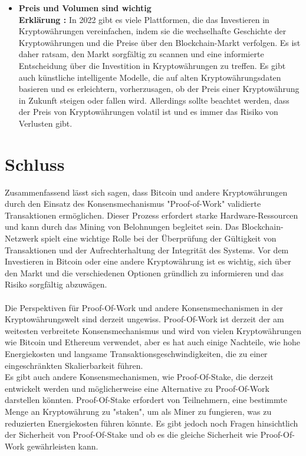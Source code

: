 \documentclass[ngerman]{scrreprt}
\begin{document}
\begin{itemize}
	
	
	\item \textbf{Preis und Volumen sind wichtig} \\
	\textbf{Erklärung :} In 2022 gibt es viele Plattformen, die das Investieren in Kryptowährungen vereinfachen, indem sie die wechselhafte Geschichte der Kryptowährungen und die Preise über den Blockchain-Markt verfolgen. Es ist daher ratsam, den Markt sorgfältig zu scannen und eine informierte Entscheidung über die Investition in Kryptowährungen zu treffen. Es gibt auch künstliche intelligente Modelle, die auf alten Kryptowährungsdaten basieren und es erleichtern, vorherzusagen, ob der Preis einer Kryptowährung in Zukunft steigen oder fallen wird. Allerdings sollte beachtet werden, dass der Preis von Kryptowährungen volatil ist und es immer das Risiko von Verlusten gibt. 
\end{itemize}


\chapter{Schluss}
Zusammenfassend lässt sich sagen, dass Bitcoin und andere Kryptowährungen durch den Einsatz des Konsensmechanismus "Proof-of-Work" validierte Transaktionen ermöglichen. Dieser Prozess erfordert starke Hardware-Ressourcen und kann durch das Mining von Belohnungen begleitet sein. Das Blockchain-Netzwerk spielt eine wichtige Rolle bei der Überprüfung der Gültigkeit von Transaktionen und der Aufrechterhaltung der Integrität des Systems. Vor dem Investieren in Bitcoin oder eine andere Kryptowährung ist es wichtig, sich über den Markt und die verschiedenen Optionen gründlich zu informieren und das Risiko sorgfältig abzuwägen.\\ \\

Die Perspektiven für Proof-Of-Work und andere Konsensmechanismen in der Kryptowährungswelt sind derzeit ungewiss. Proof-Of-Work ist derzeit der am weitesten verbreitete Konsensmechanismus und wird von vielen Kryptowährungen wie Bitcoin und Ethereum verwendet, aber es hat auch einige Nachteile, wie hohe Energiekosten und langsame Transaktionsgeschwindigkeiten, die zu einer eingeschränkten Skalierbarkeit führen. \\

Es gibt auch andere Konsensmechanismen, wie Proof-Of-Stake, die derzeit entwickelt werden und möglicherweise eine Alternative zu Proof-Of-Work darstellen könnten. Proof-Of-Stake erfordert von Teilnehmern, eine bestimmte Menge an Kryptowährung zu "staken", um als Miner zu fungieren, was zu reduzierten Energiekosten führen könnte. Es gibt jedoch noch Fragen hinsichtlich der Sicherheit von Proof-Of-Stake und ob es die gleiche Sicherheit wie Proof-Of-Work gewährleisten kann.\\ 
\end{document}
